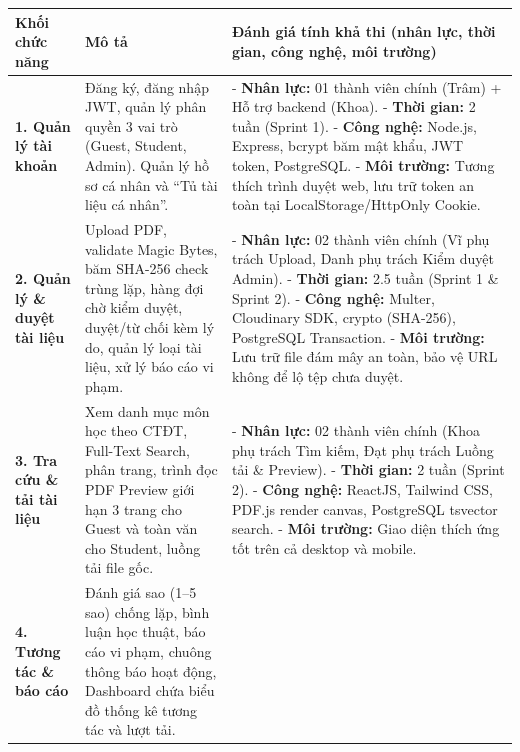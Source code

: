 \begin{table}[H]
\centering
\small
\renewcommand{\arraystretch}{1.25}
\begin{tabularx}{\textwidth}{|p{3.2cm}|p{4.2cm}|X|}
\hline
\rowcolor[HTML]{EAEAEA}
\textbf{Khối chức năng} & \textbf{Mô tả} & \textbf{Đánh giá tính khả thi (nhân lực, thời gian, công nghệ, môi trường)} \\
\hline
\textbf{1. Quản lý tài khoản} & Đăng ký, đăng nhập JWT, quản lý phân quyền 3 vai trò (Guest, Student, Admin). Quản lý hồ sơ cá nhân và ``Tủ tài liệu cá nhân''. & 
- \textbf{Nhân lực:} 01 thành viên chính (Trâm) + Hỗ trợ backend (Khoa).\newline
- \textbf{Thời gian:} 2 tuần (Sprint 1).\newline
- \textbf{Công nghệ:} Node.js, Express, bcrypt băm mật khẩu, JWT token, PostgreSQL.\newline
- \textbf{Môi trường:} Tương thích trình duyệt web, lưu trữ token an toàn tại LocalStorage/HttpOnly Cookie. \\
\hline
\textbf{2. Quản lý \& duyệt tài liệu} & Upload PDF, validate Magic Bytes, băm SHA-256 check trùng lặp, hàng đợi chờ kiểm duyệt, duyệt/từ chối kèm lý do, quản lý loại tài liệu, xử lý báo cáo vi phạm. & 
- \textbf{Nhân lực:} 02 thành viên chính (Vĩ phụ trách Upload, Danh phụ trách Kiểm duyệt Admin).\newline
- \textbf{Thời gian:} 2.5 tuần (Sprint 1 \& Sprint 2).\newline
- \textbf{Công nghệ:} Multer, Cloudinary SDK, crypto (SHA-256), PostgreSQL Transaction.\newline
- \textbf{Môi trường:} Lưu trữ file đám mây an toàn, bảo vệ URL không để lộ tệp chưa duyệt. \\
\hline
\textbf{3. Tra cứu \& tải tài liệu} & Xem danh mục môn học theo CTĐT, Full-Text Search, phân trang, trình đọc PDF Preview giới hạn 3 trang cho Guest và toàn văn cho Student, luồng tải file gốc. & 
- \textbf{Nhân lực:} 02 thành viên chính (Khoa phụ trách Tìm kiếm, Đạt phụ trách Luồng tải \& Preview).\newline
- \textbf{Thời gian:} 2 tuần (Sprint 2).\newline
- \textbf{Công nghệ:} ReactJS, Tailwind CSS, PDF.js render canvas, PostgreSQL tsvector search.\newline
- \textbf{Môi trường:} Giao diện thích ứng tốt trên cả desktop và mobile. \\
\hline
\textbf{4. Tương tác \& báo cáo} & Đánh giá sao (1--5 sao) chống lặp, bình luận học thuật, báo cáo vi phạm, chuông thông báo hoạt động, Dashboard chứa biểu đồ thống kê tương tác và lượt tải. & 

\end{tabularx}
\end{table}
